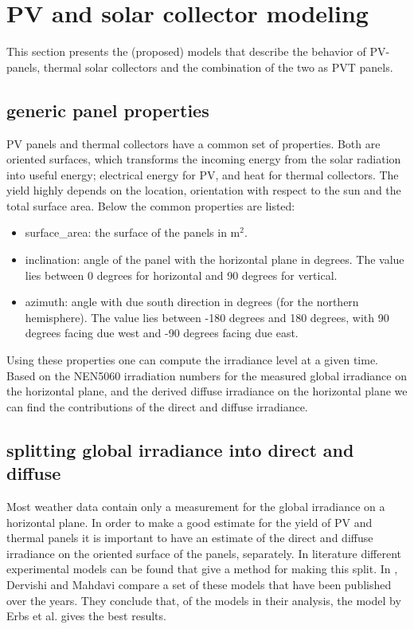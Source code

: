 \section{PV and solar collector modeling}\label{s:PV_solar_collector}

This section presents the (proposed) models that describe the behavior of PV-panels, thermal solar collectors and the combination of the two as PVT panels.


\subsection{generic panel properties}
PV panels and thermal collectors have a common set of properties. Both are oriented surfaces, which transforms the incoming energy from the solar radiation into useful energy; electrical energy for PV, and heat for thermal collectors. The yield highly depends on the location, orientation with respect to the sun and the total surface area. 
Below the common properties are listed:
\begin{itemize}
\item surface\_area: the surface of the panels in $\text{m}^2$. 
\item inclination: angle of the panel with the horizontal plane in degrees. The value lies between 0 degrees for horizontal and 90 degrees for vertical.
\item azimuth: angle with due south direction in degrees (for the northern hemisphere). The value lies between -180 degrees and 180 degrees, with 90 degrees facing due west and -90 degrees facing due east.
\end{itemize}

Using these properties one can compute the irradiance level at a given time. Based on the NEN5060 irradiation numbers for the measured global irradiance on the horizontal plane, and the derived diffuse irradiance on the horizontal plane we can find the contributions of the direct and diffuse irradiance. 

\subsection{splitting global irradiance into direct and diffuse}
Most weather data contain only a measurement for the global irradiance on a horizontal plane. In order to make a good estimate for the yield of PV and thermal panels it is important to have an estimate of the direct and diffuse irradiance on the oriented surface of the panels, separately. In literature different experimental models can be found that give a method for making this split. In \cite{dervishi2012}, Dervishi and Mahdavi compare a set of these models that have been published over the years. They conclude that, of the models in their analysis, the model by Erbs et al. \cite{erbs1982estimation} gives the best results.

